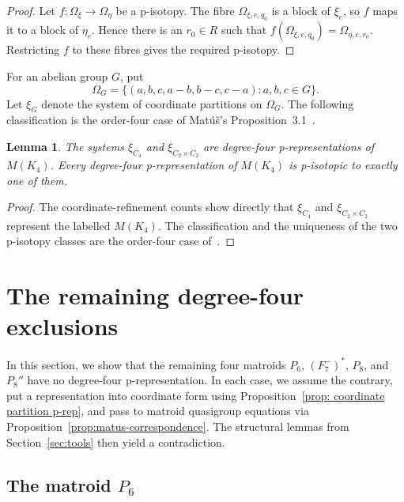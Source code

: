 \documentclass[preprint,12pt]{elsarticle}
\newtheorem{lemma}[theorem]{Lemma}
\theoremstyle{definition}
\begin{document}
\begin{proof}
Let $f:\Omega_\xi\to\Omega_\eta$ be a p-isotopy. The fibre
$\Omega_{\xi,e,q_0}$ is a block of $\xi_e$, so $f$ maps it to a block of
$\eta_e$. Hence there is an $r_0\in R$ such that
$f(\Omega_{\xi,e,q_0})=\Omega_{\eta,e,r_0}$. Restricting $f$ to these fibres
gives the required p-isotopy.
\end{proof}

For an abelian group $G$, put
\[
\Omega_G = \{(a,b,c,a-b,b-c,c-a):a,b,c\in G\}.
\] 
Let $\xi_G$ denote the system of coordinate partitions on $\Omega_G$. The
following classification is the order-four case of
Mat\'u\v{s}'s Proposition~3.1~\cite{Matus1999}.
\begin{lemma}\label{lem: p-isotopy of M(K_4)}
	The systems $\xi_{C_4}$ and $\xi_{C_2 \times C_2}$ are degree-four
	p-representations of $M(K_4)$. Every degree-four p-representation of
	$M(K_4)$ is p-isotopic to exactly one of them.
\end{lemma}
\begin{proof}
The coordinate-refinement counts show directly that
$\xi_{C_4}$ and $\xi_{C_2\times C_2}$ represent the labelled $M(K_4)$.
The classification and the uniqueness of the two p-isotopy classes are the
order-four case of~\cite[Proposition~3.1]{Matus1999}.
\end{proof}
\section{\texorpdfstring{The remaining degree-four exclusions}{The remaining degree-four exclusions}}\label{sec:structural}

In this section, we show that the remaining four matroids
$P_6$, $(F_7^-)^*$, $P_8$, and $P_8''$ have no degree-four p-representation.
In each case, we assume the contrary, put a representation into coordinate form
using Proposition~\ref{prop: coordinate partition p-rep}, and pass to matroid
quasigroup equations via Proposition~\ref{prop:matus-correspondence}. The
structural lemmas from Section~\ref{sec:tools} then yield a contradiction.

\subsection{The matroid \texorpdfstring{$P_6$}{P6}}\label{sec:p6}
\end{document}
